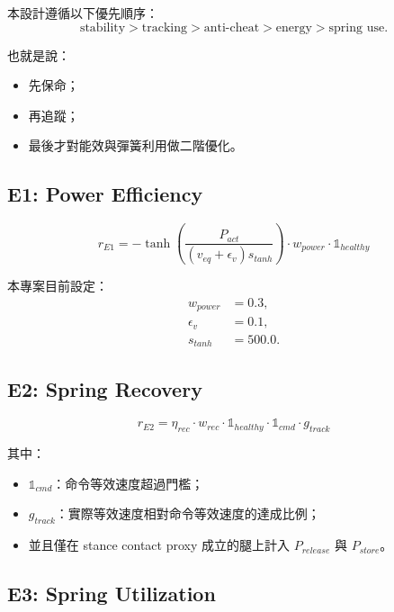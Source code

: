 \documentclass[12pt,a4paper,UTF8]{ctexart}
\begin{document}
本設計遵循以下優先順序：
\begin{equation}
\text{stability} > \text{tracking} > \text{anti-cheat} > \text{energy} > \text{spring use}.
\end{equation}

也就是說：
\begin{itemize}[leftmargin=2em]
    \item 先保命；
    \item 再追蹤；
    \item 最後才對能效與彈簧利用做二階優化。
\end{itemize}

\subsection{E1: Power Efficiency}

\begin{equation}
r_{E1}
=
-\tanh\left(
\frac{P_{act}}{(v_{eq}+\epsilon_v)s_{tanh}}
\right)
\cdot w_{power}
\cdot \mathbb{1}_{healthy}
\end{equation}

本專案目前設定：
\begin{align}
w_{power} &= 0.3, \\
\epsilon_v &= 0.1, \\
s_{tanh} &= 500.0.
\end{align}

\subsection{E2: Spring Recovery}

\begin{equation}
r_{E2}
=
\eta_{rec}\cdot w_{rec}
\cdot \mathbb{1}_{healthy}
\cdot \mathbb{1}_{cmd}
\cdot g_{track}
\end{equation}

其中：
\begin{itemize}[leftmargin=2em]
    \item $\mathbb{1}_{cmd}$：命令等效速度超過門檻；
    \item $g_{track}$：實際等效速度相對命令等效速度的達成比例；
    \item 並且僅在 stance contact proxy 成立的腿上計入 $P_{release}$ 與 $P_{store}$。
\end{itemize}

\subsection{E3: Spring Utilization}
\end{document}
